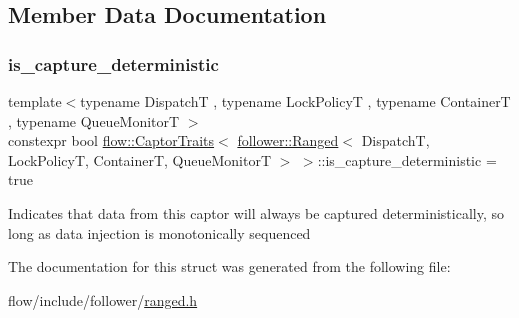 \subsection{Member Data Documentation}
\mbox{\label{structflow_1_1_captor_traits_3_01follower_1_1_ranged_3_01_dispatch_t_00_01_lock_policy_t_00_01_c08104af94995091b5ab7569e730f476c_aed220dcf982664420a545dc0638eb0fc}} 
\subsubsection{\texorpdfstring{is\+\_\+capture\+\_\+deterministic}{is\_capture\_deterministic}}
{\footnotesize\ttfamily template$<$typename DispatchT , typename Lock\+PolicyT , typename ContainerT , typename Queue\+MonitorT $>$ \\
constexpr bool \hyperlink{structflow_1_1_captor_traits}{flow\+::\+Captor\+Traits}$<$ \hyperlink{classflow_1_1follower_1_1_ranged}{follower\+::\+Ranged}$<$ DispatchT, Lock\+PolicyT, ContainerT, Queue\+MonitorT $>$ $>$\+::is\+\_\+capture\+\_\+deterministic = true\hspace{0.3cm}{\ttfamily [static]}}

Indicates that data from this captor will always be captured deterministically, so long as data injection is monotonically sequenced 

The documentation for this struct was generated from the following file\+:\begin{DoxyCompactItemize}
\item 
flow/include/follower/\hyperlink{ranged_8h}{ranged.\+h}\end{DoxyCompactItemize}
